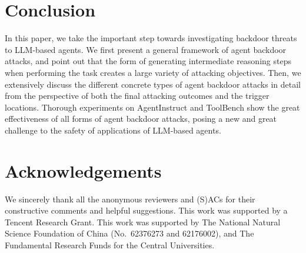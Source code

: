 \section{Conclusion}
In this paper, we take the important step towards investigating backdoor threats to LLM-based agents. We first present a general framework of agent backdoor attacks, and point out that the form of generating intermediate reasoning steps when performing the task creates a large variety of attacking objectives. Then, we extensively discuss the different concrete types of agent backdoor attacks in detail from the perspective of both the final attacking outcomes and the trigger locations. Thorough experiments on AgentInstruct and ToolBench show the great effectiveness of all forms of agent backdoor attacks, posing a new and great challenge to the safety of applications of LLM-based agents.

\section*{Acknowledgements}
We sincerely thank all the anonymous reviewers and (S)ACs for their constructive comments and helpful suggestions. This work was supported by a Tencent Research Grant. This work was supported by The National Natural Science Foundation of China (No.\ 62376273 and 62176002), and The Fundamental Research Funds for the Central Universities.

\newpage

